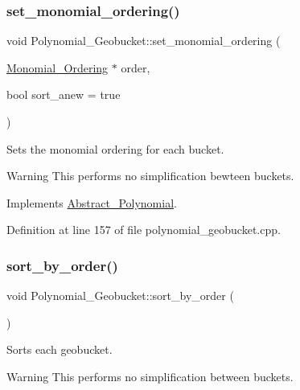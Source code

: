 \subsubsection{\texorpdfstring{set\+\_\+monomial\+\_\+ordering()}{set\_monomial\_ordering()}}
{\footnotesize\ttfamily void Polynomial\+\_\+\+Geobucket\+::set\+\_\+monomial\+\_\+ordering (\begin{DoxyParamCaption}\item[{\hyperlink{class_monomial___ordering}{Monomial\+\_\+\+Ordering} $\ast$}]{order,  }\item[{bool}]{sort\+\_\+anew = {\ttfamily true} }\end{DoxyParamCaption})\hspace{0.3cm}{\ttfamily [virtual]}}



Sets the monomial ordering for each bucket. 

\begin{DoxyWarning}{Warning}
This performs no simplification bewteen buckets. 
\end{DoxyWarning}


Implements \hyperlink{class_abstract___polynomial_ad783804725a64f09fff6eeec058afe98}{Abstract\+\_\+\+Polynomial}.



Definition at line 157 of file polynomial\+\_\+geobucket.\+cpp.

\mbox{\label{class_polynomial___geobucket_a13bc2e2e8200ee741d751ad2a55e2cfb}} 
\subsubsection{\texorpdfstring{sort\+\_\+by\+\_\+order()}{sort\_by\_order()}}
{\footnotesize\ttfamily void Polynomial\+\_\+\+Geobucket\+::sort\+\_\+by\+\_\+order (\begin{DoxyParamCaption}{ }\end{DoxyParamCaption})\hspace{0.3cm}{\ttfamily [virtual]}}



Sorts each geobucket. 

\begin{DoxyWarning}{Warning}
This performs no simplification between buckets. 
\end{DoxyWarning}



